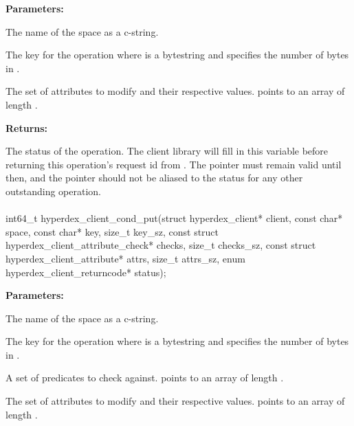 \noindent\textbf{Parameters:}
\begin{description}[labelindent=\widthof{{\code{attrs}, \code{attrs\_sz}}},leftmargin=*,noitemsep,nolistsep,align=right]
\item[\code{space}] The name of the space as a c-string.
\item[\code{key}, \code{key\_sz}] The key for the operation where  is a bytestring and  specifies the number of bytes in .
\item[\code{attrs}, \code{attrs\_sz}] The set of attributes to modify and their respective values.   points to an array of length .
\end{description}

\noindent\textbf{Returns:}
\begin{description}[labelindent=\widthof{{\code{status}}},leftmargin=*,noitemsep,nolistsep,align=right]
\item[\code{status}] The status of the operation.  The client library will fill in this variable before returning this operation's request id from .  The pointer must remain valid until then, and the pointer should not be aliased to the status for any other outstanding operation.
\end{description}

\paragraph{}
\begin{ccode}
int64_t hyperdex_client_cond_put(struct hyperdex_client* client,
                const char* space,
                const char* key, size_t key_sz,
                const struct hyperdex_client_attribute_check* checks, size_t checks_sz,
                const struct hyperdex_client_attribute* attrs, size_t attrs_sz,
                enum hyperdex_client_returncode* status);
\end{ccode}
\funcdesc 

\noindent\textbf{Parameters:}
\begin{description}[labelindent=\widthof{{\code{checks}, \code{checks\_sz}}},leftmargin=*,noitemsep,nolistsep,align=right]
\item[\code{space}] The name of the space as a c-string.
\item[\code{key}, \code{key\_sz}] The key for the operation where  is a bytestring and  specifies the number of bytes in .
\item[\code{checks}, \code{checks\_sz}] A set of predicates to check against.   points to an array of length .
\item[\code{attrs}, \code{attrs\_sz}] The set of attributes to modify and their respective values.   points to an array of length .
\end{description}

